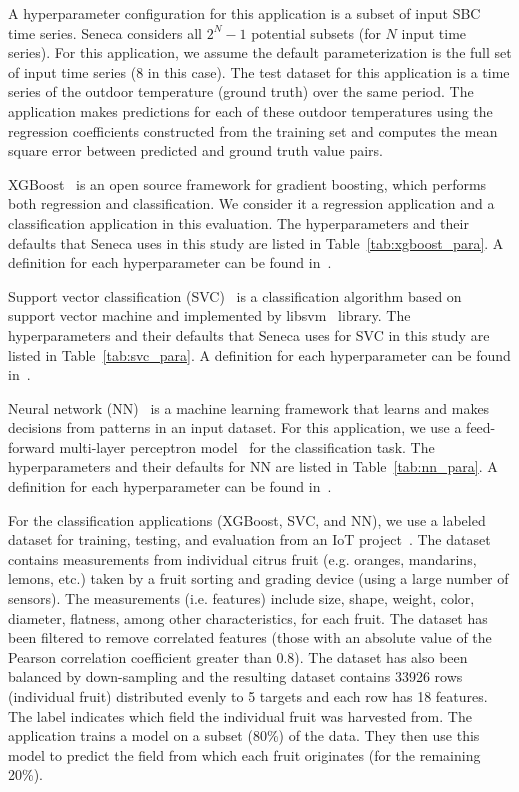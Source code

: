 A hyperparameter configuration for this application is a subset of input SBC time series.
Seneca considers all \texttt{$2^N - 1$} potential subsets (for $N$ input time series).
For this application,
we assume the default parameterization is the full set of input time series (8 in this case).
The test dataset for this application is a time series of the outdoor temperature (ground truth) 
over the same period.  The application makes predictions for each of these outdoor temperatures
using the regression coefficients constructed from the training set
and computes the mean square error between predicted and ground truth value pairs.


XGBoost~\cite{ref:xgboost-web} is an open source framework for gradient boosting, which 
performs both regression and classification. We consider it a regression application and
a classification application in this evaluation.  
The hyperparameters and their defaults that Seneca uses in this study are listed in Table~\ref{tab:xgboost_para}. A definition for each hyperparameter can be found in~\cite{ref:xgboostparams}.

Support vector classification (SVC)~\cite{ref:svc} is a classification algorithm 
based on support vector machine and implemented by libsvm~\cite{ref:libsvm} library.
The hyperparameters and their defaults that Seneca uses for SVC in this study are listed in Table~\ref{tab:svc_para}. A definition for each hyperparameter can be found in~\cite{ref:svcparams}.

Neural network (NN)~\cite{ref:neural_network} is a machine learning framework that learns 
and makes decisions from patterns in an input dataset. For this application, 
we use a feed-forward multi-layer perceptron model~\cite{ref:feedforward_nn} 
for the classification task.
The hyperparameters and their defaults for NN are listed in Table~\ref{tab:nn_para}. 
A definition for each hyperparameter can be found in~\cite{ref:nnparams}.

For the classification applications (XGBoost, SVC, and NN), we use a labeled
dataset for training, testing, and evaluation from an IoT 
project~\cite{blind}. The dataset contains measurements from individual
citrus fruit (e.g. oranges, mandarins, lemons, etc.) taken by a fruit sorting
and grading device (using a large number of sensors).  The measurements (i.e.
features) include size, shape, weight, color, diameter, flatness, among other
characteristics, for each fruit.  
The dataset has been filtered to remove correlated
features (those with an absolute value of the Pearson correlation coefficient
greater than 0.8). The dataset has also been balanced by down-sampling and the resulting 
dataset contains 33926 rows (individual fruit) distributed evenly to 5 targets and each row has
18 features.  The label indicates which field the individual fruit was harvested from.  
The application trains a model on a subset (80\%) of the
data.  They then use this model to predict the field
from which each fruit originates (for the remaining 20\%). 

